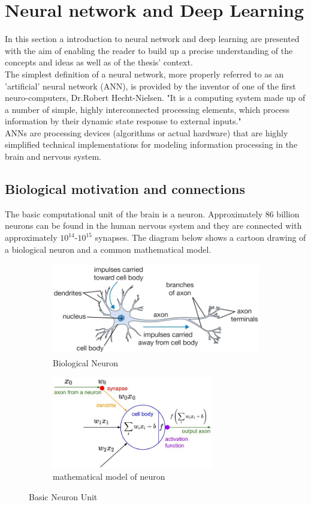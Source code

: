 \section{Neural network and Deep Learning}
In this section a introduction to neural network and deep learning are presented with the aim of enabling the reader to build up a precise understanding of the concepts and ideas as well as of the thesis' context.\\
The simplest definition of a neural network, more properly referred to as an 'artificial' neural network (ANN), is provided by the inventor of one of the first neuro-computers, Dr.Robert Hecht-Nielsen. "It is a computing system made up of a number of simple, highly interconnected processing elements, which process information by their dynamic state response to external inputs."\\
ANNs are processing devices (algorithms or actual hardware) that are highly simplified technical implementations for modeling information processing in the brain and nervous system.
\subsection{Biological motivation and connections}
The basic computational unit of the brain is a neuron. Approximately 86 billion neurons can be found in the human nervous system and they are connected with approximately $10^14$-$10^15$ synapses. The diagram below shows a cartoon drawing of a biological neuron and a common mathematical model.
\begin{figure}[h]
	
	\begin{subfigure}{0.5\textwidth}
		\includegraphics[width=0.9\linewidth, height=4cm]{Figures/Section3_NeuroStructure.png} 
		\captionsetup{justification=centering}
		\caption{Biological Neuron}
		\label{fig:Bio neuron}
	\end{subfigure}
	\begin{subfigure}{0.5\textwidth}
			\includegraphics[width=0.9\linewidth, height=4cm]{Figures/Section3_NeuroMathe.jpeg}
			\captionsetup{justification=centering}
			\caption{mathematical model of neuron}
			\label{fig:mathe neuron}
	\end{subfigure}
\captionsetup{justification=centering}
\caption{Basic Neuron Unit}
\label{fig:unit of a neuron}
\end{figure}

